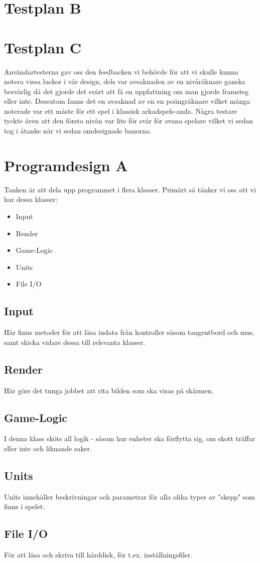 \documentclass[a4paper,11pt]{article}
\begin{document}
\section{Testplan B}

\section{Testplan C}
Användartesterna gav oss den feedbacken vi behövde för att vi skulle kunna notera vissa luckor i vår design, dels var avsaknaden av en nivåräknare ganska besvärlig då det gjorde det svårt att få en uppfattning om man gjorde framsteg eller inte. Dessutom fanns det en avsaknad av en en poängräknare vilket många noterade var ett måste för ett spel i klassisk arkadspels-anda. Några testare tyckte även att den första nivån var lite för svår för ovana spelare vilket vi sedan tog i åtanke när vi sedan omdesignade banorna.

\section{Programdesign A}
Tanken är att dela upp programmet i flera klasser. Primärt så tänker vi oss att vi har dessa klasser:
\begin{multicols}{2}
\begin{itemize}
\item Input
\item Render
\item Game-Logic
\item Units
\item File I/O
\end{itemize}

\subsection{Input}
Här finns metoder för att läsa indata från kontroller såsom tangentbord och mus, samt skicka vidare dessa till relevanta klasser.

\subsection{Render}
Här görs det tunga jobbet att rita bilden som ska visas på skärmen.

\subsection{Game-Logic}
I denna klass sköts all logik - såsom hur enheter ska förflytta sig, om skott träffar eller inte och liknande saker.

\subsection{Units}
Units innehåller beskrivningar och parametrar för alla olika typer av "skepp" som finns i spelet.

\subsection{File I/O}
För att läsa och skriva till hårddisk, för t.ex. inställningsfiler.
\end{multicols}
\end{document}
